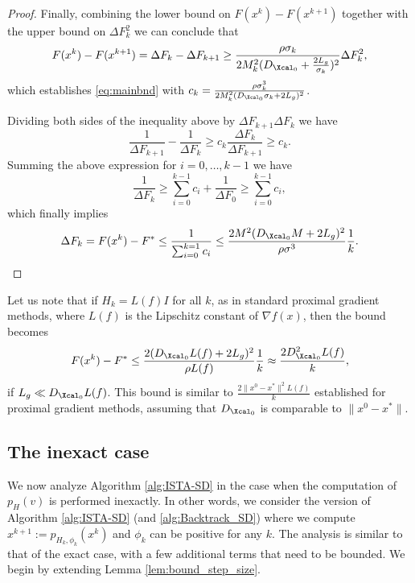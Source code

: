 \documentclass[11pt]{article}
\numberwithin{equation}{section}
\begin{document}
\begin{proof}
	Finally, combining the lower bound on $F(x^k)-F(x^{k+1})$ together with the upper bound on $\Delta F_k^2$  we can conclude that
	\[
	F(x^{k})-F(x^{k+1})=\Delta F_{k}-\Delta F_{k+1}\geq  \frac{\rho\sigma_k}{2M_k^2 (D_{\Xcal_0}+\frac{2L_g}{\sigma_k})^2}\Delta F_k^2,
	\]
	which establishes \eqref{eq:mainbnd} with $c_k= \frac{\rho\sigma_k^3}{2M_k^2 (D_{\Xcal_0}\sigma_k+2L_g)^2}$. 

	Dividing both sides of the inequality above  by $\Delta F_{k+1}\Delta F_k$ we have
	\[
	\frac{1}{\Delta F_{k+1}}-\frac{1}{\Delta F_{k}}\geq c_k\frac{\Delta F_{k}}{\Delta F_{k+1}}\geq c_k.
	\]
	Summing the above expression for  $i=0, \ldots, k-1$ we have
	\[
	\frac{1}{\Delta F_{k}}\geq \sum_{i=0}^{k-1}c_i+\frac{1}{\Delta F_{0}} \geq \sum_{i=0}^{k-1}c_i,
	\]
	which finally implies
	\[
	\Delta F_k=F(x^k)-F^*\leq \frac{1}{\sum_{i=0}^{k=1} c_i} \leq  \frac{2M^2 (D_{\Xcal_0}M+2L_g)^2}{\rho\sigma^3}\frac{1}{k}.
	\]
\end{proof}

Let us note that if $H_k=L(f)I$ for all $k$, as in standard proximal gradient methods, where $L(f)$ is the Lipschitz constant of $\nabla f(x)$, then
the bound becomes
\[
F(x^k)-F^*\leq   \frac{ 2(D_{\Xcal_0}L(f)+2L_g)^2}{\rho L(f)}\frac{1}{k}\approx \frac{ 2D_{\Xcal_0}^2L(f)}{k},
\]
if $L_g\ll D_{\Xcal_0}L(f)$. This  bound is similar to $\frac{2\|x^0-x^*\|^2L(f)}{k}$ established for proximal gradient methods, assuming that $D_{\Xcal_0}$ is comparable to
$\|x^0-x^*\|$. 


\subsection{The inexact case} %
\label{sec:conv_inexact}

We now  analyze Algorithm \ref{alg:ISTA-SD}  in the case when the computation of $p_H( v)$ is performed inexactly. 
In other words, we consider the version of Algorithm \ref{alg:ISTA-SD} (and \ref{alg:Backtrack_SD}) where we compute 
$x^{k+1}  := p_{H_k, \phi_k}(x^k)$ and $\phi_k$ can be positive for any $k$. The analysis is similar to that of the exact case, with a few additional terms that need to be bounded. We begin by extending Lemma \ref{lem:bound_step_size}.
\end{document}
